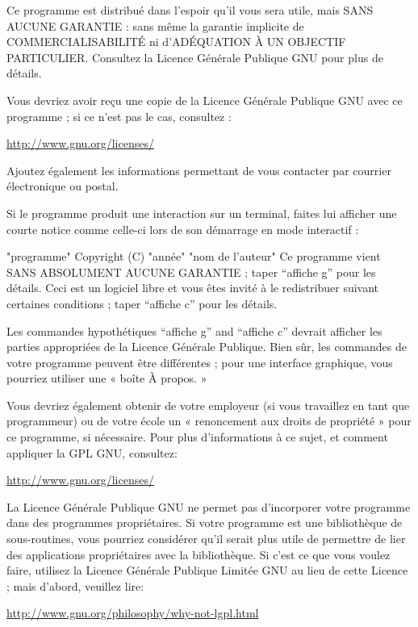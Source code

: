 {  Ce programme est distribué dans l’espoir qu’il vous sera utile, mais SANS
  AUCUNE GARANTIE : sans même la garantie implicite de COMMERCIALISABILITÉ
  ni d’ADÉQUATION À UN OBJECTIF PARTICULIER. Consultez la Licence Générale
  Publique GNU pour plus de détails.

  Vous devriez avoir reçu une copie de la Licence Générale Publique GNU avec
  ce programme ; si ce n’est pas le cas, consultez :
\begin{center}
\href{http://www.gnu.org/licenses/}{http://www.gnu.org/licenses/}
\end{center}

Ajoutez également les informations permettant de vous contacter par
courrier électronique ou postal.

Si le programme produit une interaction sur un terminal, faites lui
afficher une courte notice comme celle-ci lors de son démarrage en mode
interactif :

  "programme" Copyright (C) "année" "nom de l’auteur"
  Ce programme vient SANS ABSOLUMENT AUCUNE GARANTIE ; taper “affiche g” pour
  les détails. Ceci est un logiciel libre et vous êtes invité à le redistribuer
  suivant certaines conditions ; taper “affiche c” pour les détails.

Les commandes hypothétiques “affiche g” and “affiche c” devrait
afficher les parties appropriées de la Licence Générale Publique. Bien
sûr, les commandes de votre programme peuvent être différentes ; pour
une interface graphique, vous pourriez utiliser une « boîte À propos. »

Vous devriez également obtenir de votre employeur (si vous travaillez
en tant que programmeur) ou de votre école un « renoncement aux droits
de propriété » pour ce programme, si nécessaire. Pour plus
d’informations à ce sujet, et comment appliquer la GPL GNU, consultez:
\begin{center}
\href{http://www.gnu.org/licenses/}{http://www.gnu.org/licenses/}
\end{center}

La Licence Générale Publique GNU ne permet pas d’incorporer votre
programme dans des programmes propriétaires. Si votre programme est une
bibliothèque de sous-routines, vous pourriez considérer qu’il serait
plus utile de permettre de lier des applications propriétaires avec la
bibliothèque. Si c’est ce que vous voulez faire, utilisez la Licence
Générale Publique Limitée GNU au lieu de cette Licence ; mais d’abord,
veuillez lire:
\begin{center}
 \href{http://www.gnu.org/philosophy/why-not-lgpl.html}{http://www.gnu.org/philosophy/why-not-lgpl.html}
\end{center}






}
\endinput
